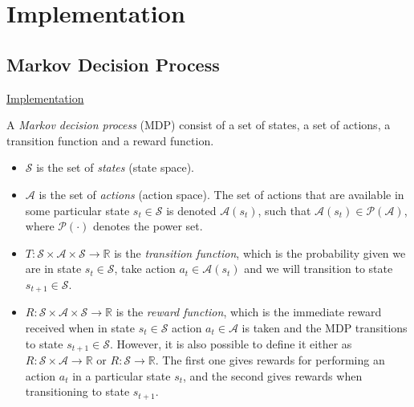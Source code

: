 \documentclass{article}
\newcommand{\GithubURL}[2]{
\noindent
\href{https://github.com/davidrobles/mlnd-capstone-code/blob/master/#1}{#2}
\break
}
\begin{document}
\section{Implementation}

\subsection{Markov Decision Process}

\GithubURL{capstone/rl/mdp.py}{Implementation}

A \emph{Markov decision process} (MDP) consist of a set of states, a set of actions, a transition
function and a reward function.

\begin{itemize}

    \item $\mathcal{S}$ is the set of \emph{states} (state space).

    \item $\mathcal{A}$ is the set of \emph{actions} (action space). The set of actions that are
      available in some particular state $s_t \in \mathcal{S}$ is denoted $\mathcal{A}(s_t)$, such
      that $\mathcal{A}(s_t) \in \mathcal{P}(\mathcal{A})$, where $\mathcal{P}(\cdot)$ denotes the
      power set.

    \item $ T : \mathcal{S} \times \mathcal{A} \times \mathcal{S} \to \mathbb{R}$ is the
      \emph{transition function}, which is the probability given we are in state $s_t \in
      \mathcal{S}$, take action $a_t \in \mathcal{A}(s_t)$ and we will transition to state $s_{t+1}
      \in \mathcal{S}$.

    \item $ R : \mathcal{S} \times \mathcal{A} \times \mathcal{S} \to \mathbb{R}$ is the
      \emph{reward function}, which is the immediate reward received when in state $s_t \in
      \mathcal{S}$ action $a_t \in \mathcal{A}$ is taken and the MDP transitions to state $s_{t+1}
      \in \mathcal{S}$. However, it is also possible to define it either as $ R : \mathcal{S} \times
      \mathcal{A} \to \mathbb{R}$ or $R : \mathcal{S} \to \mathbb{R}$. The first one gives rewards
      for performing an action $a_t$ in a particular state $s_t$, and the second gives rewards when
      transitioning to state $s_{t+1}$.

\end{itemize}
\end{document}
